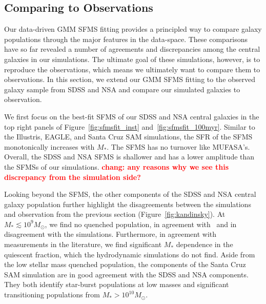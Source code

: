 \documentclass[preprint2,tighten]{aastex62}
\newcommand{\todo}[1]{{\bf \textcolor{red}{ #1}}}
\begin{document}
\subsection{Comparing to Observations}
Our data-driven GMM SFMS fitting provides a principled way to compare 
galaxy populations through the major features in the data-space. These 
comparisons have so far revealed a number of agreements and discrepancies
among the central galaxies in our simulations. The ultimate goal of 
these simulations, however, is to reproduce the observations, which means
we ultimately want to compare them to observations. In this section, we 
extend our GMM SFMS fitting to the observed galaxy sample from SDSS and NSA
and compare our simulated galaxies to observation.

We first focus on the best-fit SFMS of our SDSS and NSA central galaxies
in the top right panels of Figure~\ref{fig:sfmsfit_inst} and~\ref{fig:sfmsfit_100myr}. 
Similar to the Illustris, EAGLE, and Santa Cruz SAM simulations, the SFR of 
the SFMS monotonically increases with $M_*$. The SFMS has no turnover like
MUFASA's. Overall, the SDSS and NSA SFMS is shallower and has a lower amplitude 
than the SFMSs of our simulations. \todo{chang: any reasons why we see this 
discrepancy from the simulation side?}

Looking beyond the SFMS, the other components of the SDSS and NSA central 
galaxy population further highlight the disagreements between the 
simulations and observation from the previous section (Figure~\ref{fig:kandinsky}). 
At $M_* \lesssim 10^9M_\odot$, we find no quenched population, in agreement 
with~\cite{geha2012} and in disagreement with the simulations. Furthermore, 
in agreement with measurements in the literature, we find significant $M_*$
dependence in the quiescent fraction, which the hydrodynamic simulations do 
not find. Aside from the low stellar mass quenched population, the components 
of the Santa Cruz SAM simulation are in good agreement with the SDSS and NSA 
components. They both identify star-burst populations at low masses and 
significant transitioning populations from $M_* > 10^{10}M_\odot$.  

\end{document}
